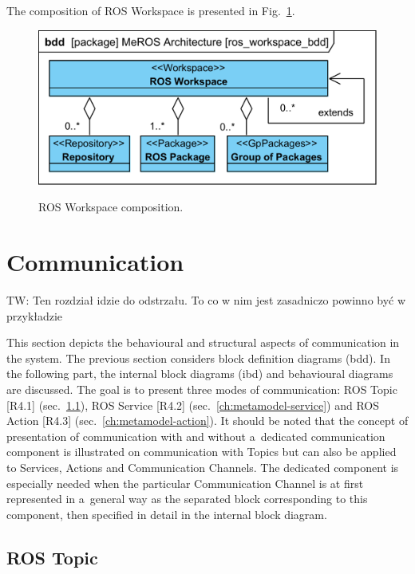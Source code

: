 \documentclass[11pt,oneside,a4paper]{report}
\newcommand{\twci}[1]{
	\textcolor{amber}{TW: #1}}
\begin{document}
The composition of ROS Workspace is presented in Fig.~\ref{fig:ros_workspace_bdd}.

	\begin{figure}[H]
		\centering
		\begin{center}
			{\includegraphics[scale=1.0]{diagrams/ros_workspace_bdd.png}}
		\end{center}
		\caption{ROS Workspace composition.} 
		\label{fig:ros_workspace_bdd}
	\end{figure}
	
\pagebreak

\section{Communication}
\label{sec:metamodel-communication}
	
	\twci{Ten rozdział idzie do odstrzału. To co w nim jest zasadniczo powinno być w przykładzie}
	
	
	This section depicts the behavioural and structural aspects of communication in the system. The previous section considers block definition diagrams (bdd). In the following part, the internal block diagrams (ibd) and behavioural diagrams are discussed. The goal is to present three modes of communication: ROS Topic [R4.1] (sec.~\ref{ch:metamodel-topic}), ROS Service [R4.2] (sec.~\ref{ch:metamodel-service}) and ROS Action [R4.3] (sec.~\ref{ch:metamodel-action}). It should be noted that the concept of presentation of communication with and without a~dedicated communication component is illustrated on communication with Topics but can also be applied to Services, Actions and Communication Channels. The dedicated component is especially needed when the particular Communication Channel is at first represented in a~general way as the separated block corresponding to this component, then specified in detail in the internal block diagram. 
	
	\subsection{ROS Topic}
	\label{ch:metamodel-topic}
		
\end{document}

